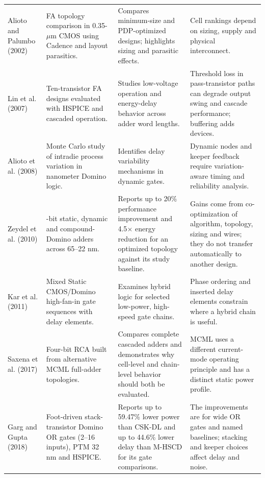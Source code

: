 \documentclass[11pt,a4paper]{article}
\begin{document}
\begin{longtable}{>{\raggedright\arraybackslash}p{}>{\raggedright\arraybackslash}p{}>{\raggedright\arraybackslash}p{}>{\raggedright\arraybackslash}p{}}
Alioto and Palumbo (2002) \cite{Alioto2002} & FA topology comparison in 0.35-$\mu$m CMOS using Cadence and layout parasitics. & Compares minimum-size and PDP-optimized designs; highlights sizing and parasitic effects. & Cell rankings depend on sizing, supply and physical interconnect.\\
Lin et al. (2007) \cite{Lin2007} & Ten-transistor FA designs evaluated with HSPICE and cascaded operation. & Studies low-voltage operation and energy-delay behavior across adder word lengths. & Threshold loss in pass-transistor paths can degrade output swing and cascade performance; buffering adds devices.\\
Alioto et al. (2008) \cite{Alioto2008} & Monte Carlo study of intradie process variation in nanometer Domino logic. & Identifies delay variability mechanisms in dynamic gates. & Dynamic nodes and keeper feedback require variation-aware timing and reliability analysis.\\
Zeydel et al. (2010) \cite{Zeydel2010} & 64-bit static, dynamic and compound-Domino adders across 65--22 nm. & Reports up to 20\% performance improvement and 4.5$\times$ energy reduction for an optimized topology against its study baseline. & Gains come from co-optimization of algorithm, topology, sizing and wires; they do not transfer automatically to another design.\\
Kar et al. (2011) \cite{Kar2011} & Mixed Static CMOS/Domino high-fan-in gate sequences with delay elements. & Examines hybrid logic for selected low-power, high-speed gate chains. & Phase ordering and inserted delay elements constrain where a hybrid chain is useful.\\
Saxena et al. (2017) \cite{Saxena2017} & Four-bit RCA built from alternative MCML full-adder topologies. & Compares complete cascaded adders and demonstrates why cell-level and chain-level behavior should both be evaluated. & MCML uses a different current-mode operating principle and has a distinct static power profile.\\
Garg and Gupta (2018) \cite{Garg2018} & Foot-driven stack-transistor Domino OR gates (2--16 inputs), PTM 32 nm and HSPICE. & Reports up to 59.47\% lower power than CSK-DL and up to 44.6\% lower delay than M-HSCD for its gate comparisons. & The improvements are for wide OR gates and named baselines; stacking and keeper choices affect delay and noise.\\
\bottomrule
\end{longtable}
\normalsize
\end{document}
